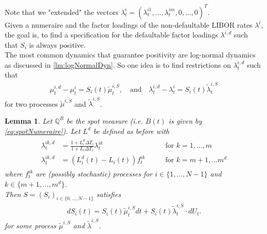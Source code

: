\documentclass[12pt]{article}
\newtheorem{lemma}[theorem]{Lemma}
\begin{document}
	Note that we "extended" the vectors $\lambda^{i}_t = (\lambda^{i 1}_t, ..., \lambda^{i m}_t, 0, ..., 0)^T$.\\
	Given a numeraire and the factor loadings of the non-defaultable LIBOR rates $\lambda^i$, the goal is, to find a specification for the defaultable factor loadings $\lambda^{i,d}$ such that $S_i$ is always positive.\\
	The most common dynamics that guarantee positivity are log-normal dynamics as discussed in \cref{lm:logNormalDyn}. So one idea is to find restrictions on $\lambda^{i,d}_t$ such that 
	\begin{align*}
		\mu^{i,d}_t - \mu^{i}_t = S_i(t)\tilde{\mu}^{i,S}_t, \quad \text{and} 
		\quad \lambda^{i,d}_t - \lambda^{i}_t = S_i(t)\tilde{\lambda}^{i,S}_t
	\end{align*}
	for two processes $\tilde{\mu}^{i,S}$ and $\tilde{\lambda}^{i,S}$.
	\begin{lemma}\label{lem:flguaranteeingpositivespreads}
		Let $\mathbb{Q}^B$ be the spot measure (i.e. $B(t)$ is given by \cref{eq:spotNumeraire}).
		Let $L^d$ be defined as before with 
		\begin{align}
			\begin{aligned}
				\lambda^{i k,d}_t &= \frac{1+L^d_i\Delta T_i}{1+L_i\Delta T_i} \lambda^{i k}_t \quad \quad & \text{for } k= 1,...,m\\
				\lambda^{i k,d}_t &= \left(L^d_i(t) - L_i(t)\right)f^{i k}_t \quad \quad & \text{for } k= m+1, ... m^d
			\end{aligned}
		\end{align}
		where $f^{i k}_t$ are (possibly stochastic) processes for $i\in\{1, ..., N-1\}$ and $k\in \{m+1, ..., m^d\}$.\\
		Then $S = (S_i)_{i\in \{0, ..., N-1\}}$ satisfies 
		\begin{align*}
			dS_i(t) = S_i(t)\tilde{\mu}^{i,S}_t dt + S_i(t)\tilde{\lambda}^{i,S}_t \cdot dU_t.
		\end{align*}
		for some process $\tilde{\mu}^{i,S}$ and $\tilde{\lambda}^{i,S}$.
	\end{lemma}
\end{document}
